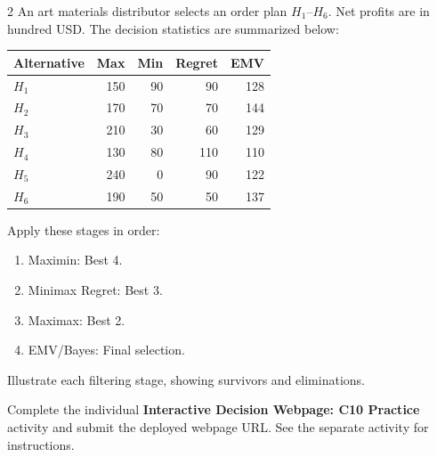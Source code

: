 \begin{multicols}{2}
\columnbreak
{}
An art materials distributor selects an order plan $H_1$--$H_6$. Net profits are in hundred USD. The decision statistics are summarized below:
\vspace{-3mm}
\begin{center}\small\setlength{\tabcolsep}{4pt}
	\begin{tabular}{lrrrr}\toprule
		Alternative & Max & Min & Regret & EMV\\ \midrule
		$H_1$ & 150 & 90 & 90 & 128\\
		$H_2$ & 170 & 70 & 70 & 144\\
		$H_3$ & 210 & 30 & 60 & 129\\
		$H_4$ & 130 & 80 & 110 & 110\\
		$H_5$ & 240 & 0 & 90 & 122\\
		$H_6$ & 190 & 50 & 50 & 137\\
		\bottomrule
	\end{tabular}
\end{center}
\vspace{-3mm}
Apply these stages in order:
\begin{enumerate}[leftmargin=*]
	\item Maximin: Best 4.
	\item Minimax Regret: Best 3.
	\item Maximax: Best 2.
	\item EMV/Bayes: Final selection.
\end{enumerate}
Illustrate each filtering stage, showing survivors and eliminations.

\par
{}
		Complete the individual \textbf{Interactive Decision Webpage: C10 Practice} activity and submit the deployed webpage URL. See the separate activity for instructions.
		
	\end{multicols}

